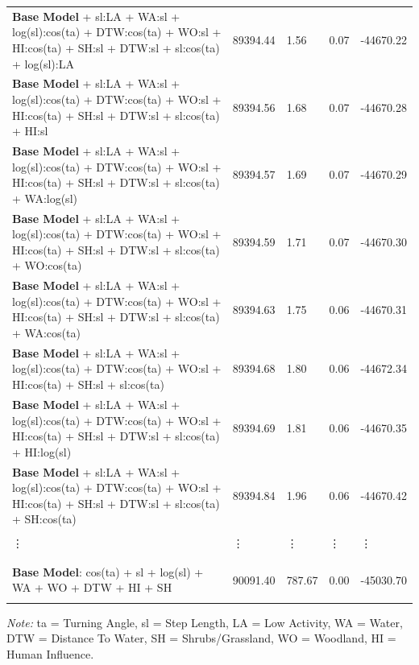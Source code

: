 \documentclass[abstract=off,10pt,a4paper,bibliography=totocnumbered]{article}
\begin{document}
\begin{landscape}
\begin{table}[hbpt]
\begin{center}
{\begin{threeparttable}
\begin{tabular}{lllll}
      \textbf{Base Model} + sl:LA + WA:sl + log(sl):cos(ta) + DTW:cos(ta) + WO:sl + HI:cos(ta) + SH:sl + DTW:sl + sl:cos(ta) + log(sl):LA  & 89394.44 & 1.56          & 0.07   & -44670.22 \\
      \textbf{Base Model} + sl:LA + WA:sl + log(sl):cos(ta) + DTW:cos(ta) + WO:sl + HI:cos(ta) + SH:sl + DTW:sl + sl:cos(ta) + HI:sl       & 89394.56 & 1.68          & 0.07   & -44670.28 \\
      \textbf{Base Model} + sl:LA + WA:sl + log(sl):cos(ta) + DTW:cos(ta) + WO:sl + HI:cos(ta) + SH:sl + DTW:sl + sl:cos(ta) + WA:log(sl)  & 89394.57 & 1.69          & 0.07   & -44670.29 \\
      \textbf{Base Model} + sl:LA + WA:sl + log(sl):cos(ta) + DTW:cos(ta) + WO:sl + HI:cos(ta) + SH:sl + DTW:sl + sl:cos(ta) + WO:cos(ta)  & 89394.59 & 1.71          & 0.07   & -44670.30 \\
      \textbf{Base Model} + sl:LA + WA:sl + log(sl):cos(ta) + DTW:cos(ta) + WO:sl + HI:cos(ta) + SH:sl + DTW:sl + sl:cos(ta) + WA:cos(ta)  & 89394.63 & 1.75          & 0.06   & -44670.31 \\
      \textbf{Base Model} + sl:LA + WA:sl + log(sl):cos(ta) + DTW:cos(ta) + WO:sl + HI:cos(ta) + SH:sl + sl:cos(ta)                        & 89394.68 & 1.80          & 0.06   & -44672.34 \\
      \textbf{Base Model} + sl:LA + WA:sl + log(sl):cos(ta) + DTW:cos(ta) + WO:sl + HI:cos(ta) + SH:sl + DTW:sl + sl:cos(ta) + HI:log(sl)  & 89394.69 & 1.81          & 0.06   & -44670.35 \\
      \textbf{Base Model} + sl:LA + WA:sl + log(sl):cos(ta) + DTW:cos(ta) + WO:sl + HI:cos(ta) + SH:sl + DTW:sl + sl:cos(ta) + SH:cos(ta)  & 89394.84 & 1.96          & 0.06   & -44670.42 \\
      \hdashline
      \\
      \vdots                                                                                                                               & \vdots   & \vdots        & \vdots & \vdots    \\
      \\
      \hdashline
      \\
      \textbf{Base Model}: cos(ta) + sl + log(sl) + WA + WO + DTW + HI + SH                                                                & 90091.40 & 787.67        & 0.00   & -45030.70 \\
      \\
      \bottomrule
     \end{tabular}
     \begin{tablenotes}
      \item \textit{Note:} ta = Turning Angle, sl = Step Length, LA = Low Activity, WA = Water,
      DTW = Distance To Water, SH = Shrubs/Grassland, WO = Woodland, HI =
      Human Influence.
     \end{tablenotes}
    \end{threeparttable}
   }
  \end{center}
 \end{table}
 \vfill
 \raisebox{-1cm}{\makebox[\linewidth]{\thepage}}
\end{landscape}
\end{document}
